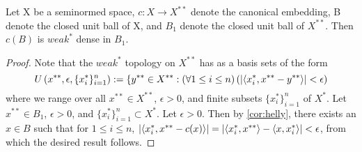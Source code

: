 \begin{thm}[Goldstine]
    \label{thm:goldstine}
    Let X be a seminormed space, $c:X \to X^{**}$ denote the canonical embedding, B denote the closed unit ball of X, and $B_1$ denote the closed unit ball of $X^{**}$. Then $c(B)$ is $weak^*$ dense in $B_1$.   
    \begin{proof}
        Note that the $weak^*$ topology on $X^{**}$ has as a basis sets of the form
        \begin{equation}
            U\left( x^{**},\epsilon,\{x_i^*\}_{i=1}^n\right):=\{ y^{**} \in X^{**} : \left( \forall 1 \leq i \leq n\right)\left(  \left| \left\langle x_i^*,x^{**}-y^{**} \right\rangle \right| < \epsilon \right)
        \end{equation}
        where we range over all $x^{**} \in X^{**}$, $\epsilon > 0$, and finite subsets $\{x_i^*\}_{i=1}^n$ of $X^*$. 
        Let $x^{**} \in B_1$, $\epsilon > 0$, and $\{x_i^*\}_{i=1}^n \subset X^*$. 
        Let $\epsilon > 0$. Then by \ref{cor:helly}, there exists an $x \in B$ such that for $1 \leq i \leq n$, $\left| \left\langle x_i^*,x^{**}-c(x) \right\rangle \right|= \left| \left\langle x_i^*,x^{**} \right\rangle-\left\langle x,x_i^* \right\rangle \right| < \epsilon$, from which the desired result follows.
    \end{proof}
\end{thm} 
